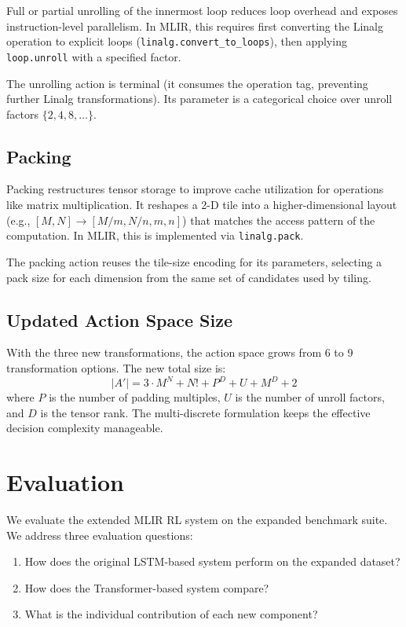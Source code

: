 \documentclass[10pt,twocolumn]{article}
\begin{document}
Full or partial unrolling of the innermost loop reduces loop overhead and exposes instruction-level parallelism. In MLIR, this requires first converting the Linalg operation to explicit loops (\texttt{linalg.convert\_to\_loops}), then applying \texttt{loop.unroll} with a specified factor.

The unrolling action is terminal (it consumes the operation tag, preventing further Linalg transformations). Its parameter is a categorical choice over unroll factors $\{2, 4, 8, \ldots\}$.

\subsection{Packing}

Packing restructures tensor storage to improve cache utilization for operations like matrix multiplication. It reshapes a 2-D tile into a higher-dimensional layout (e.g., $[M, N] \to [M/m, N/n, m, n]$) that matches the access pattern of the computation. In MLIR, this is implemented via \texttt{linalg.pack}.

The packing action reuses the tile-size encoding for its parameters, selecting a pack size for each dimension from the same set of candidates used by tiling.

\subsection{Updated Action Space Size}

With the three new transformations, the action space grows from 6 to 9 transformation options. The new total size is:
\begin{equation}
|A'| = 3 \cdot M^N + N! + P^D + U + M^D + 2
\end{equation}
where $P$ is the number of padding multiples, $U$ is the number of unroll factors, and $D$ is the tensor rank. The multi-discrete formulation keeps the effective decision complexity manageable.

\section{Evaluation}

We evaluate the extended MLIR RL system on the expanded benchmark suite. We address three evaluation questions:
\begin{enumerate}
\item How does the original LSTM-based system perform on the expanded dataset?
\item How does the Transformer-based system compare?
\item What is the individual contribution of each new component?
\end{enumerate}
\end{document}
